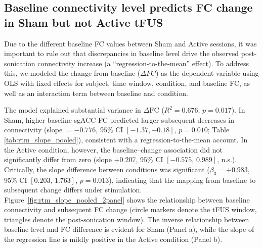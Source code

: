         
        \subsection*{Baseline connectivity level predicts FC change in Sham but not Active tFUS}
        \noindent
        Due to the different baseline FC values between Sham and Active sessions, it was important to rule out that discrepancies in baseline level drive the observed post-sonication connectivity increase (a ``regression-to-the-mean'' effect). To address this, we modeled the change from baseline ($\Delta FC$) as the dependent variable using OLS with fixed effects for subject, time window, condition, and baseline FC, as well as an interaction term between baseline and condition. 

        The model explained substantial variance in $\Delta \mathrm{FC}$ ($R^2=0.676$; $p=0.017$). In Sham, higher baseline sgACC FC predicted larger subsequent decreases in connectivity (slope $=-0.776$, $95\%$ CI $[-1.37,-0.18]$, $p=0.010$; Table \ref{tab:rtm_slope_pooled}), consistent with a regression-to-the-mean account. In the Active condition, however, the baseline--change association did not significantly differ from zero (slope $+0.207$, $95\%$ CI $[-0.575,\,0.989]$, n.s.). Critically, the slope difference between conditions was significant ($\beta_3=+0.983$, 95\% CI $[0.203,\,1.763]$, $p=0.013$), indicating that the mapping from baseline to subsequent change differs under stimulation. Figure~\ref{fig:rtm_slope_pooled_2panel} shows the relationship between baseline connectivity and subsequent FC change (circle markers denote the tFUS window, triangles denote the post-sonication window). The inverse relationship between baseline level and FC difference is evident for Sham (Panel a), while the slope of the regression line is mildly positive in the Active condition (Panel b).


